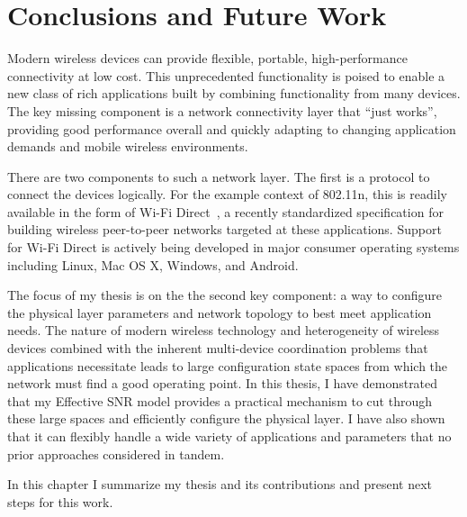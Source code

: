 \ifx\mainfile\undefined

\setcounter{chapter}{9} %
\fi

\cleardoublepage
\chapter{Conclusions and Future Work}
\label{chap:conclusion}

Modern wireless devices can provide flexible, portable, high-performance connectivity at low cost. This unprecedented functionality is poised to enable a new class of rich applications built by combining functionality from many devices. The key missing component is a network connectivity layer that ``just works'', providing good performance overall and quickly adapting to changing application demands and mobile wireless environments.

There are two components to such a network layer. The first is a protocol to connect the devices logically. For the example context of 802.11n, this is readily available in the form of Wi-Fi Direct~\cite{wifi_direct}, a recently standardized specification for building wireless peer-to-peer networks targeted at these applications. Support for Wi-Fi Direct is actively being developed in major consumer operating systems including Linux, Mac OS X, Windows, and Android.

The focus of my thesis is on the the second key component: a way to configure the physical layer parameters and network topology to best meet application needs. The nature of modern wireless technology and heterogeneity of wireless devices combined with the inherent multi-device coordination problems that applications necessitate leads to large configuration state spaces from which the network must find a good operating point. In this thesis, I have demonstrated that my Effective SNR model provides a practical mechanism to cut through these large spaces and efficiently configure the physical layer. I have also shown that it can flexibly handle a wide variety of applications and parameters that no prior approaches considered in tandem.

In this chapter I summarize my thesis and its contributions and present next steps for this work.

